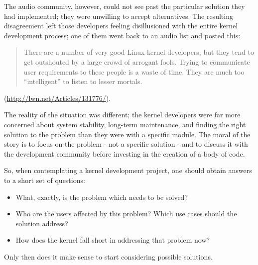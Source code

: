 \documentclass[a4paper,8pt,english]{sphinxmanual}
\begin{document}
The audio community, however, could not see past the particular solution
they had implemented; they were unwilling to accept alternatives.  The
resulting disagreement left those developers feeling disillusioned with the
entire kernel development process; one of them went back to an audio list
and posted this:
\begin{quote}

There are a number of very good Linux kernel developers, but they
tend to get outshouted by a large crowd of arrogant fools. Trying
to communicate user requirements to these people is a waste of
time. They are much too ``intelligent'' to listen to lesser mortals.
\end{quote}

(\href{http://lwn.net/Articles/131776/}{http://lwn.net/Articles/131776/}).

The reality of the situation was different; the kernel developers were far
more concerned about system stability, long-term maintenance, and finding
the right solution to the problem than they were with a specific module.
The moral of the story is to focus on the problem - not a specific solution
- and to discuss it with the development community before investing in the
creation of a body of code.

So, when contemplating a kernel development project, one should obtain
answers to a short set of questions:
\begin{itemize}
\item {} 
What, exactly, is the problem which needs to be solved?

\item {} 
Who are the users affected by this problem?  Which use cases should the
solution address?

\item {} 
How does the kernel fall short in addressing that problem now?

\end{itemize}

Only then does it make sense to start considering possible solutions.
\end{document}
